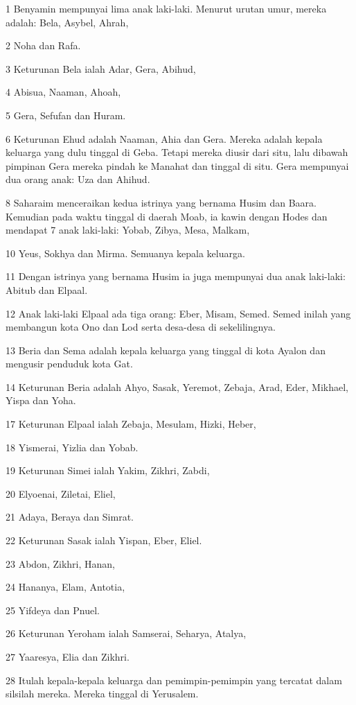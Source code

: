 \par 1 Benyamin mempunyai lima anak laki-laki. Menurut urutan umur, mereka adalah: Bela, Asybel, Ahrah,
\par 2 Noha dan Rafa.
\par 3 Keturunan Bela ialah Adar, Gera, Abihud,
\par 4 Abisua, Naaman, Ahoah,
\par 5 Gera, Sefufan dan Huram.
\par 6 Keturunan Ehud adalah Naaman, Ahia dan Gera. Mereka adalah kepala keluarga yang dulu tinggal di Geba. Tetapi mereka diusir dari situ, lalu dibawah pimpinan Gera mereka pindah ke Manahat dan tinggal di situ. Gera mempunyai dua orang anak: Uza dan Ahihud.
\par 8 Saharaim menceraikan kedua istrinya yang bernama Husim dan Baara. Kemudian pada waktu tinggal di daerah Moab, ia kawin dengan Hodes dan mendapat 7 anak laki-laki: Yobab, Zibya, Mesa, Malkam,
\par 10 Yeus, Sokhya dan Mirma. Semuanya kepala keluarga.
\par 11 Dengan istrinya yang bernama Husim ia juga mempunyai dua anak laki-laki: Abitub dan Elpaal.
\par 12 Anak laki-laki Elpaal ada tiga orang: Eber, Misam, Semed. Semed inilah yang membangun kota Ono dan Lod serta desa-desa di sekelilingnya.
\par 13 Beria dan Sema adalah kepala keluarga yang tinggal di kota Ayalon dan mengusir penduduk kota Gat.
\par 14 Keturunan Beria adalah Ahyo, Sasak, Yeremot, Zebaja, Arad, Eder, Mikhael, Yispa dan Yoha.
\par 17 Keturunan Elpaal ialah Zebaja, Mesulam, Hizki, Heber,
\par 18 Yismerai, Yizlia dan Yobab.
\par 19 Keturunan Simei ialah Yakim, Zikhri, Zabdi,
\par 20 Elyoenai, Ziletai, Eliel,
\par 21 Adaya, Beraya dan Simrat.
\par 22 Keturunan Sasak ialah Yispan, Eber, Eliel.
\par 23 Abdon, Zikhri, Hanan,
\par 24 Hananya, Elam, Antotia,
\par 25 Yifdeya dan Pnuel.
\par 26 Keturunan Yeroham ialah Samserai, Seharya, Atalya,
\par 27 Yaaresya, Elia dan Zikhri.
\par 28 Itulah kepala-kepala keluarga dan pemimpin-pemimpin yang tercatat dalam silsilah mereka. Mereka tinggal di Yerusalem.
